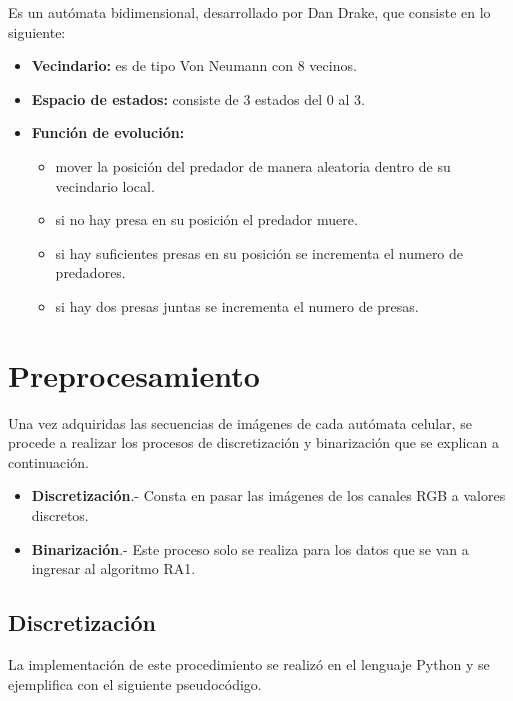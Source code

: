 Es un autómata bidimensional, desarrollado por Dan Drake, que consiste en lo siguiente:
\begin{itemize}
	\item \textbf{Vecindario:} es de tipo Von Neumann con 8 vecinos.
	\item \textbf{Espacio de estados:} consiste de 3 estados del 0 al 3.
	\item \textbf{Función de evolución:} 
	\begin{itemize}
		\item mover la posición del predador de manera aleatoria dentro de su vecindario local.
		\item si no hay presa en su posición el predador muere.
		\item si hay suficientes presas en su posición se incrementa el numero de predadores.
		\item si hay dos presas juntas se incrementa el numero de presas.
	\end{itemize}
\end{itemize}

\section{Preprocesamiento}
Una vez adquiridas las secuencias de imágenes de cada autómata celular, se procede a realizar los procesos de discretización y binarización que se explican a continuación.
\begin{itemize}
	\item \textbf{Discretización}.- Consta en pasar las imágenes de los canales RGB a valores discretos.
	\item \textbf{Binarización}.- Este proceso solo se realiza para los datos que se van a ingresar al algoritmo RA1.
\end{itemize}

\subsection{Discretización}

La implementación de este procedimiento se realizó en el lenguaje Python y se ejemplifica con el siguiente pseudocódigo.

